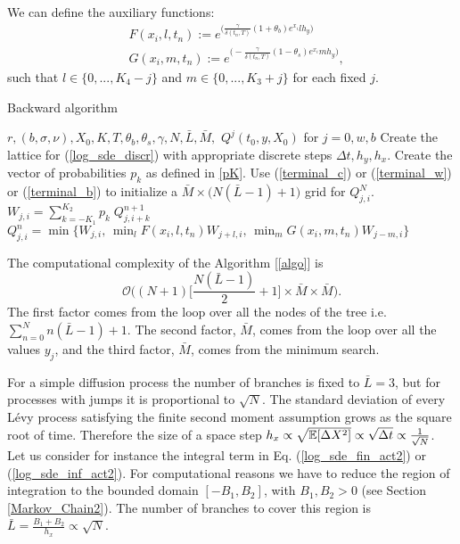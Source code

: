 We can define the auxiliary functions: 
\begin{align}\label{FG}
& F(x_i,l,t_n) := e^{\bigl(\frac{\gamma}{\delta(t_n,T)} (1+\theta_b) e^{x_i} lh_y \bigr)}  \\ \nonumber
& G(x_i,m,t_n) := e^{\bigl(- \frac{\gamma}{\delta(t_n,T)} (1-\theta_s) e^{x_i} mh_y \bigr)}, 
\end{align}
such that $l\in \{0,...,K_4-j\}$ and $m\in \{0,...,K_3+j\}$ for each fixed $j$. 
\begin{algorithm}[H] 
\caption{Backward algorithm}
\label{algo}
 \begin{algorithmic}[1]
    \REQUIRE $r, (b,\sigma,\nu), X_0, K, T, \theta_b, \theta_s, \gamma, N, \bar L, \bar M, $
    \ENSURE $Q^j(t_0,y,X_0)$ for $j=0,w,b$
      \STATE Create the lattice for (\ref{log_sde_discr}) with appropriate discrete steps $\Delta t, h_y, h_x$.
      \STATE Create the vector of probabilities $p_k$ as defined in \ref{pK}.  
      \STATE Use (\ref{terminal_c}) or (\ref{terminal_w}) or (\ref{terminal_b}) to initialize a $\bar M \times \bigl( N(\bar L-1)+1 \bigl)$ grid for $Q^N_{j,i}$.  
      \STATE $W_{j,i} = \sum_{k = -K_1}^{K_2} p_k \; Q^{n+1}_{j,i+k}$
      \STATE $Q^{n}_{j,i} = \min \biggl\{ W_{j,i} , \, \min_l F(x_i,l,t_n) W_{j+l,i}, \, \min_m G(x_i,m,t_n) W_{j-m,i}  \biggr\}$ 
      \ENDFOR
  \end{algorithmic}
\end{algorithm} 

\noindent
The computational complexity of the Algorithm [\ref{algo}] is 
$$\mathcal{O}\biggl( (N+1)\bigl[\frac{N(\bar L-1)}{2}+1 \bigr] \times \bar M \times \bar M \biggr).$$
The first factor comes from the loop over all the nodes of the tree i.e. $\sum_{n=0}^N n(\bar L-1)+1$. The second factor, $\bar M$, comes from the loop over all the values $y_j$, 
and the third factor, $\bar M$, comes from the minimum search. 

For a simple diffusion process the number of branches is fixed to $\bar L = 3$, but for processes with jumps it is proportional to $\sqrt N$.
The standard deviation of every Lévy process satisfying the finite second moment assumption grows as the square root of time.
Therefore the size of a space step $h_x \propto \sqrt{\mathbb{E}[\Delta X^2]} \propto \sqrt{\Delta t} \propto \frac{1}{\sqrt{N}}$.
Let us consider for instance the integral term in Eq. (\ref{log_sde_fin_act2}) or (\ref{log_sde_inf_act2}).
For computational reasons we have to reduce the region of integration to the bounded domain $[-B_1,B_2]$, with $B_1,B_2>0$ (see Section \ref{Markov_Chain2}). 
The number of branches to cover this
region is $\bar L = \frac{B_1+B_2}{h_x} \propto \sqrt{N}$. 

